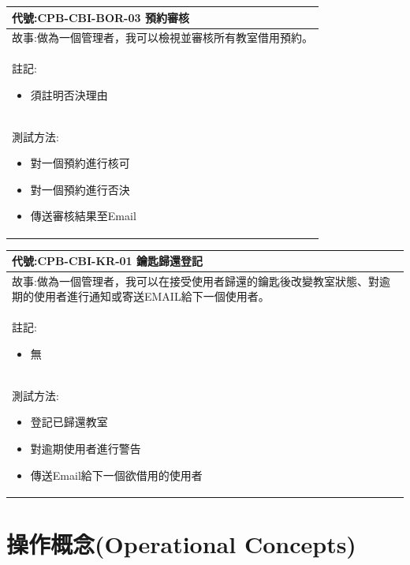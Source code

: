 \documentclass{article}
\begin{document}
\begin{table}
    \begin{tabular}{| m{13cm} |}
		\hline
	代號:CPB-CBI-BOR-03	預約審核	\\ \hline
	故事:做為一個管理者，我可以檢視並審核所有教室借用預約。		\\	\hline
	註記:
	\begin{itemize}
		\item 須註明否決理由
	\end{itemize}		\\ \hline
	測試方法:	
	\begin{itemize}
		\item 對一個預約進行核可
		\item 對一個預約進行否決
		\item 傳送審核結果至Email
	\end{itemize}
	\\	\hline
    \end{tabular}
\end{table}

\begin{table}
    \begin{tabular}{| m{13cm} |}
		\hline
	代號:CPB-CBI-KR-01	鑰匙歸還登記	\\ \hline
	故事:做為一個管理者，我可以在接受使用者歸還的鑰匙後改變教室狀態、對逾期的使用者進行通知或寄送EMAIL給下一個使用者。		\\	\hline
	註記:
	\begin{itemize}
		\item 無
	\end{itemize}		\\ \hline
	測試方法:	
	\begin{itemize}
		\item 登記已歸還教室
		\item 對逾期使用者進行警告
		\item 傳送Email給下一個欲借用的使用者
	\end{itemize}
	\\	\hline
    \end{tabular}
\end{table}

\newpage

\section[操作概念(OPERATIONAL CONCEPTS)]{操作概念(Operational Concepts)}

\newpage
\end{document}
